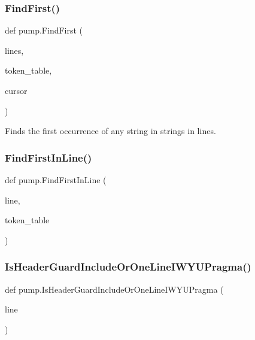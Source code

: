 \subsubsection{\texorpdfstring{FindFirst()}{FindFirst()}}
{\footnotesize\ttfamily def pump.\+Find\+First (\begin{DoxyParamCaption}\item[{}]{lines,  }\item[{}]{token\+\_\+table,  }\item[{}]{cursor }\end{DoxyParamCaption})}

\begin{DoxyVerb}Finds the first occurrence of any string in strings in lines.\end{DoxyVerb}
 \mbox{\label{namespacepump_af9f92ec64fe45399c7e051115a107ee7}} 
\subsubsection{\texorpdfstring{FindFirstInLine()}{FindFirstInLine()}}
{\footnotesize\ttfamily def pump.\+Find\+First\+In\+Line (\begin{DoxyParamCaption}\item[{}]{line,  }\item[{}]{token\+\_\+table }\end{DoxyParamCaption})}

\mbox{\label{namespacepump_ac8a553b60dc83d100361a0e98d98451b}} 
\subsubsection{\texorpdfstring{IsHeaderGuardIncludeOrOneLineIWYUPragma()}{IsHeaderGuardIncludeOrOneLineIWYUPragma()}}
{\footnotesize\ttfamily def pump.\+Is\+Header\+Guard\+Include\+Or\+One\+Line\+I\+W\+Y\+U\+Pragma (\begin{DoxyParamCaption}\item[{}]{line }\end{DoxyParamCaption})}

\mbox{\label{namespacepump_aa33101b01d5781710262f3b5dadd8bc8}} 
